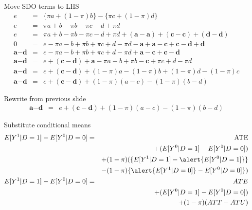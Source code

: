 \documentclass{beamer}
\begin{document}
\begin{frame}[plain]

  \begin{block}{Move SDO terms to LHS}
    \begin{eqnarray*}
      e&=&\{\pi{a} + (1-\pi)b\} - \{\pi{c} + (1-\pi)d\}  \\
      e&=&\pi{a} + b - \pi{b} - \pi{c} - d + \pi{d}  \\
      e&=&\pi{a} + b - \pi{b} - \pi{c} - d + \pi{d} + (\textbf{a} - \textbf{a}) + (\textbf{c} - \textbf{c}) + (\textbf{d} - \textbf{d})  \\
      0&=&e-\pi{a} - b + \pi{b} + \pi{c} + d - \pi{d} - \textbf{a} + \textbf{a} - \textbf{c} + \textbf{c} - \textbf{d} + \textbf{d}  \\
      \textbf{a}-\textbf{d}&=&e-\pi{a} - b + \pi{b} + \pi{c} + d - \pi{d}  + \textbf{a} - \textbf{c} + \textbf{c} - \textbf{d}  \\
      \textbf{a}-\textbf{d}&=&e  + (\textbf{c} - \textbf{d}) + \textbf{a}-\pi{a} - b + \pi{b} - \textbf{c} + \pi{c} + d - \pi{d} \\
      \textbf{a}-\textbf{d}&=&e  + (\textbf{c} - \textbf{d}) + (1-\pi)a -(1-\pi)b + (1-\pi)d - (1-\pi)c  \\
      \textbf{a}-\textbf{d}&=&e  + (\textbf{c} - \textbf{d}) + (1-\pi)(a-c) -(1-\pi)(b-d)
    \end{eqnarray*}
  \end{block}


\end{frame}

\begin{frame}[shrink=20,plain]
  \begin{block}{Rewrite from previous slide}
    \begin{eqnarray*}
      \textbf{a}-\textbf{d}&=&e  + (\textbf{c} - \textbf{d}) + (1-\pi)(a-c) -(1-\pi)(b-d)
    \end{eqnarray*}
  \end{block}

  \begin{block}{Substitute conditional means}
    \begin{eqnarray*}
      E[Y^1|D=1] - E[Y^0|D=0] &=& \text{ATE}  \\
      &&+ (E[Y^0|D=1] - E[Y^0|D=0])  \\
      && + (1-\pi)(\{E[Y^1|D=1] - \alert{E[Y^0|D=1]}\}  \\
      && - (1-\pi)\{\alert{E[Y^1|D=0]} - E[Y^0|D=0]\}) \\
      E[Y^1 | D=1] - E[Y^0 | D=0]  &=& ATE \\
      &&+ (E[Y^0|D=1] - E[Y^0|D=0])  \\
      && + (1-\pi)(ATT - ATU)
    \end{eqnarray*}
  \end{block}
\end{frame}
\end{document}
